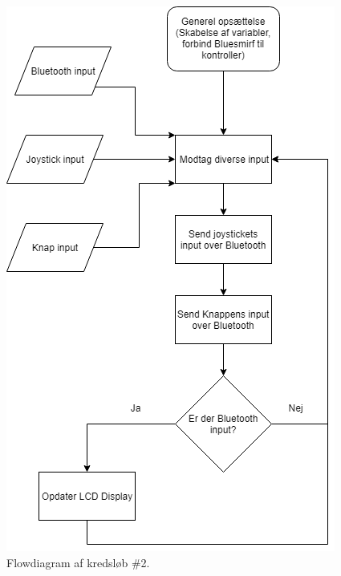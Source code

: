 \begin{figure}[H]
\centering
\includegraphics[scale=0.8]{Billeder/Flowchart2.png}
\caption{Flowdiagram af kredsløb \#2.}
\label{fig:Flowdiagram2}
\end{figure}

